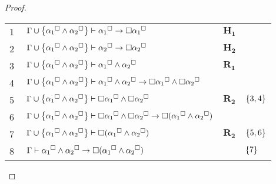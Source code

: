 \begin{tcolorbox}[enhanced jigsaw, breakable, sharp corners, colframe=black, colback=white, boxrule=0.5pt, left=1.5mm, right=1.5mm, top=1.5mm, bottom=1.5mm]
\begin{theorem}[Estabilidade]
\begin{proof}
            \vspace{.5\baselineskip}
            \footnotesize
            \setlength{\rowskip}{.5\baselineskip}
            \begin{xltabular}{\textwidth}{r | X l l}
                \scriptsize{\phantom{1}1}\phantom{ } & $\ \Gamma\cup\set{{\alpha_1}^\medsquare\wedge{\alpha_2}^\medsquare}\entails{\alpha_1}^\medsquare\to\nec{\alpha_1}^\medsquare$                                                                 & $\mathbf{H_1}$                                  & \\[\rowskip]
                \scriptsize{\phantom{1}2}\phantom{ } & $\ \Gamma\cup\set{{\alpha_1}^\medsquare\wedge{\alpha_2}^\medsquare}\entails{\alpha_2}^\medsquare\to\nec{\alpha_2}^\medsquare$                                                                 & $\mathbf{H_2}$                                  & \\[\rowskip]
                \scriptsize{\phantom{1}3}\phantom{ } & $\ \Gamma\cup\set{{\alpha_1}^\medsquare\wedge{\alpha_2}^\medsquare}\entails{\alpha_1}^\medsquare\wedge{\alpha_2}^\medsquare$                                                                  & $\hyperref[modal.rule.1]{\mathbf{R_1}}$         & \\[\rowskip]
                \scriptsize{\phantom{1}4}\phantom{ } & $\ \Gamma\cup\set{{\alpha_1}^\medsquare\wedge{\alpha_2}^\medsquare}\entails{\alpha_1}^\medsquare\wedge{\alpha_2}^\medsquare\to\nec{\alpha_1}^\medsquare\wedge\nec{\alpha_2}^\medsquare$       &                  & \\[\rowskip]
                \scriptsize{\phantom{1}5}\phantom{ } & $\ \Gamma\cup\set{{\alpha_1}^\medsquare\wedge{\alpha_2}^\medsquare}\entails\nec{\alpha_1}^\medsquare\wedge\nec{\alpha_2}^\medsquare$                                                          & $\hyperref[modal.rule.2]{\mathbf{R_2}}$         & $\left\{3,4\right\}$\\[\rowskip]
                \scriptsize{\phantom{1}6}\phantom{ } & $\ \Gamma\cup\set{{\alpha_1}^\medsquare\wedge{\alpha_2}^\medsquare}\entails\nec{\alpha_1}^\medsquare\wedge\nec{\alpha_2}^\medsquare\to\nec({\alpha_1}^\medsquare\wedge{\alpha_2}^\medsquare)$ &  &\\[\rowskip]
                \scriptsize{\phantom{1}7}\phantom{ } & $\ \Gamma\cup\set{{\alpha_1}^\medsquare\wedge{\alpha_2}^\medsquare}\entails\nec({\alpha_1}^\medsquare\wedge{\alpha_2}^\medsquare)$                                                            & $\hyperref[modal.rule.2]{\mathbf{R_2}}$         & $\left\{5,6\right\}$\\[\rowskip]
                \scriptsize{\phantom{1}8}\phantom{ } & $\ \Gamma\entails{\alpha_1}^\medsquare\wedge{\alpha_2}^\medsquare\to\nec({\alpha_1}^\medsquare\wedge{\alpha_2}^\medsquare)$                                                                   &  & $\left\{7\right\}$
            \end{xltabular}
            \normalsize


\end{proof}
\end{theorem}
\end{tcolorbox}
